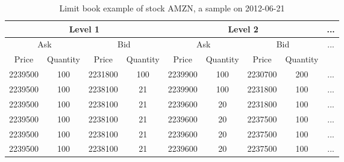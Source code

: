 \begin{table}
   	\caption{Limit book example of stock AMZN,   a sample on 2012-06-21}
   	\label{tab:limit}
   	\begin{center} 
   		\begin{tabular}{c c c c c c c c c}
   			\hline
   			\multicolumn{4}{c}{ Level 1} & \multicolumn{4}{c}{Level 2}&... \\
   			\hline
   			 \multicolumn{2}{c}{Ask}  & \multicolumn{2}{c}{Bid} & \multicolumn{2}{c}{Ask}  & \multicolumn{2}{c}{Bid}&... \\
   			 \hline
   			  Price & Quantity & Price& Quantity& Price& Quantity& Price & Quantity\\
   			  2239500&	100&	2231800&	100&	2239900&	100&	2230700&	200&...\\
   			  2239500& 100&	2238100&	21&	2239900&	100&	2231800&	100
   			  &...\\
   			  2239500&	100&	2238100&	21&	2239600&	20&	2231800&	100
   			  &...\\
   			  2239500&	100&	2238100&	21&	2239600&	20&	2237500&	100
   			  &...\\
   			  2239500&	100&	2238100&	21&	2239600&	20&	2237500&	100
   			  &...\\
   			  2239500&	100&	2238100&	21&	2239600&	20&	2237500&	100
   			  &...\\
   		
   			\hline 
   		\end{tabular}
   	\end{center}
\end{table} 


